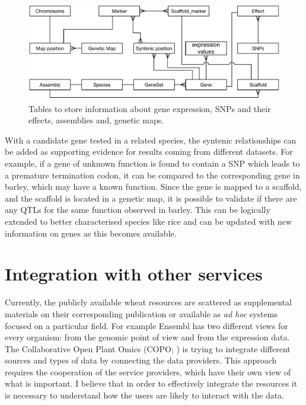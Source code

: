 \begin{figure}[h!]
\includegraphics[width=1\textwidth]{Conclusions/Figures/MspVsExpVsSNPvsSyntheni.pdf}
\caption{Tables to store information about gene expression, SNPs and their effects, assemblies and, genetic maps. }
\label{fig:discussion:MapVsExpVsSNPvsSyntheni}
\end{figure}

With a candidate gene tested in a related species, the syntenic relationships can be added as supporting evidence for results coming from different datasets. 
For example, if a gene of unknown function is found to contain a SNP which leads to a premature termination codon, it can be compared to the corresponding gene in barley, which may have a known function.  
Since the gene is mapped to a scaffold, and the scaffold is located in a genetic map, it is possible to validate if there are any QTLs for the same function observed in barley. 
This can be logically extended to better characterised species like rice and can be updated with new information on genes as this becomes available. 


\section{Integration with other services}

Currently, the publicly available wheat resources are scattered as supplemental materials on their corresponding publication or available as \textit{ad hoc} systems focused on a particular field.
For example Ensembl has two different views for every organism: from the genomic point of view and from the expression data. 
The Collaborative Open Plant Omics (COPO; \citealt{Davey2015}) is trying to integrate different sources and types of data by connecting the data providers. 
This approach requires the cooperation of the service providers, which have their own view of what is important. 
I believe that in order to effectively integrate the resources it is necessary to understand how the users are likely to interact with the data.

